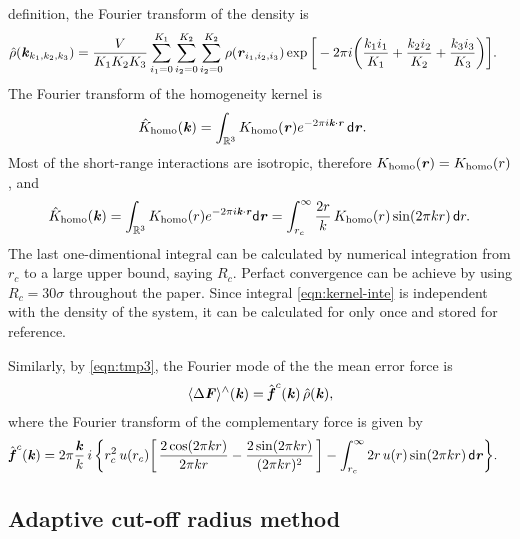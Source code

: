 \documentclass[aps,pre,preprint]{revtex4-1}
\renewcommand{\v}[1]{\textbf{\textit{#1}}}
\renewcommand{\d}[1]{\textsf{#1}}
\begin{document}
definition, the Fourier transform of the density is
\begin{align}
  \hat\rho(\v k_{k_1,k_2,k_3})
  & =
  \frac{V}{K_1K_2K_3}
  \sum_{i_1=0}^{K_1}\sum_{i_2=0}^{K_2}\sum_{i_2=0}^{K_2}
  \rho(\v r_{i_1,i_2,i_3})
  \exp\bigg[
  -2\pi i\bigg(
  \frac{k_1i_1}{K_1} + \frac{k_2i_2}{K_2} + \frac{k_3i_3}{K_3}
  \bigg)
  \bigg].
\end{align}
The Fourier transform of the homogeneity kernel is 
\begin{align}
  \hat K_{\textrm{homo}}(\v k)
  &=
  \int_{\mathbb R^3}K_{\textrm{homo}}(\v r)e^{-2\pi i\v k\cdot\v r}\,\d d\v r.
\end{align}
Most of the short-range interactions are isotropic, therefore
$K_{\textrm{homo}}(\v r) = K_{\textrm{homo}}(r)$, and
\begin{align}\label{eqn:kernel-inte}
  \hat{K}_{\textrm{homo}}(\v k)
  =
  \int_{\mathbb R^3}K_{\textrm{homo}}(r)e^{-2\pi i\v k\cdot\v r}\d d\v r
  =
  \int_{r_c}^\infty \frac{2 r}k\, K_{\textrm{homo}}(r) \sin(2\pi kr)\,\d dr.
\end{align}
The last one-dimentional integral can be calculated by numerical
integration from $r_c$ to a large upper bound, saying $R_c$. Perfact
convergence can be achieve by using $R_c = 30\sigma$ throughout the
paper. Since integral \eqref{eqn:kernel-inte} is independent with the
density of the system, it can be calculated for only once and stored
for reference.

Similarly, by \eqref{eqn:tmp3}, the Fourier mode of the the mean error
force is
\begin{align}\label{eqn:tmp17}
  \langle\Delta\v F\rangle^\wedge(\v k) =
  \hat{\v f}^c(\v k)\,
  \hat\rho(\v k),
\end{align}
where the Fourier transform of the complementary force is given by
\begin{align}\label{eqn:tmp18}
  \hat{\v f}^c(\v k) 
  & = 
  2\pi\frac{\v k}k\, i\,
  \bigg\{
  r_c^2\,u(r_c)
  \bigg[\,
  \frac{2\cos(2\pi kr)}{2\pi kr}
  -\frac{2\sin(2\pi kr)}{(2\pi kr)^2}
  \,\bigg] 
  -
  \int_{r_c}^\infty 2r\,u(r)\sin(2\pi kr)\,\d d\v r
  \bigg\}.
\end{align}


\subsection{Adaptive cut-off radius method}
\end{document}
